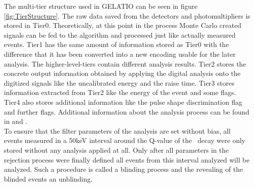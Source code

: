 \documentclass[encoding=utf8,british]{tumphthesis}
\begin{document}
The multi-tier structure used in GELATIO can be seen in figure \ref{fig:TierStructure}.
The raw data saved from the detectors and photomultipliers is stored in Tier0.
Theoretically, at this point in the process Monte Carlo created signals can be fed to the algorithm and processed just like actually measured events.
Tier1 has the same amount of information stored as Tier0 with the difference that it has been converted into a new encoding usable for the later analysis.
The higher-level-tiers contain different analysis results.
Tier2 stores the concrete output information obtained by applying the digital analysis onto the digitized signals like the uncalibrated energy and the raise time.
Tier3 stores information extracted from Tier2 like the energy of the event and some flags.
Tier4 also stores additional information like the pulse shape discrimination flag and further flags.
Additional information about the analysis process can be found in \cite{agostini_gelatio:_2011} and \cite{agostini_off-line_2011}.
\\

To ensure that the filter parameters of the analysis are set without bias, all events measured in a  50keV interval around the Q-value of the \twonu\ decay were only stored without any analysis applied at all.
Only after all parameters in the rejection process were finally defined all events from this interval analyzed will be analyzed. 
Such a procedure is called a blinding process and the revealing of the blinded events an unblinding. 
\\
\end{document}
